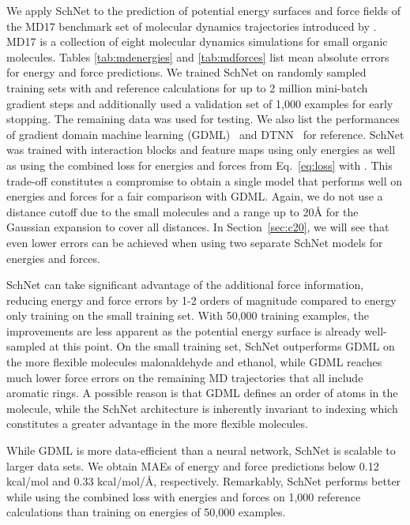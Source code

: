 \documentclass[aip,jcp,reprint,graphicx]{revtex4-1}
\newcommand{\new}[1]{#1}
\begin{document}
We apply SchNet to the prediction of potential energy surfaces and force fields of the MD17 benchmark set of molecular dynamics trajectories introduced by \citet{chmiela2017machine}.
MD17 is a collection of eight molecular dynamics simulations for small organic molecules.
Tables \ref{tab:mdenergies} and \ref{tab:mdforces} list mean absolute errors for energy and force predictions.
We trained SchNet on randomly sampled training sets with  and  reference calculations for up to 2 million mini-batch gradient steps and additionally used a validation set of 1,000 examples for early stopping.
The remaining data was used for testing.
We also list the performances of \new{gradient domain machine learning (GDML)}~\citep{chmiela2017machine} and DTNN~\citep{schutt2017quantum} for reference.
SchNet was trained with  interaction blocks \new{and  feature maps} using only energies as well as using the combined loss for energies and forces from Eq.~\ref{eq:loss} with .
This trade-off constitutes a compromise to obtain a single model that performs well on energies and forces for a fair comparison with GDML.
\new{Again, we do not use a distance cutoff due to the small molecules and a range up to 20{\AA} for the Gaussian expansion to cover all distances.}
In Section~\ref{sec:c20}, we will see that even lower errors can be achieved when using two separate SchNet models for energies and forces.

SchNet can take significant advantage of the additional force information, reducing energy and force errors by 1-2 orders of magnitude compared to energy only training on the small training set.
With 50,000 training examples, the improvements are less apparent as the potential energy surface is already well-sampled at this point.
On the small training set, SchNet outperforms GDML on the more flexible molecules malonaldehyde and ethanol, while GDML reaches much lower force errors on the remaining MD trajectories that all include aromatic rings.
A possible reason is that GDML defines an order of atoms in the molecule, while the SchNet architecture is inherently invariant to indexing which constitutes a greater advantage in the more flexible molecules.

While GDML is more data-efficient than a neural network, SchNet is scalable to larger data sets.
We obtain MAEs of energy and force predictions below 0.12 kcal/mol and 0.33 kcal/mol/{\AA}, respectively.
Remarkably, SchNet performs better while using the combined loss with energies and forces on 1,000 reference calculations than training on energies of 50,000 examples.
\end{document}
